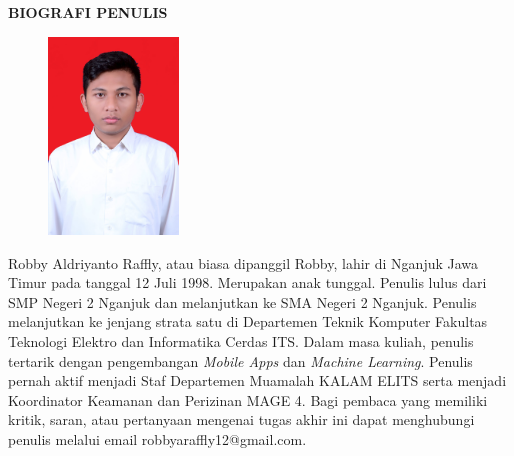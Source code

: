 \begin{center}
\Large\textbf{BIOGRAFI PENULIS}
\end{center}
\vspace{1ex}

\begin{figure}
	\centering
	\vspace{-3ex}	
	\includegraphics[width=0.31\textwidth]{img/robby.jpg}
	\vspace{-4ex}
\end{figure}
\noindent Robby Aldriyanto Raffly, atau biasa dipanggil Robby, lahir di Nganjuk Jawa Timur pada tanggal 12 Juli 1998. Merupakan anak tunggal. Penulis lulus dari SMP Negeri 2 Nganjuk dan melanjutkan ke SMA Negeri 2 Nganjuk. Penulis melanjutkan ke jenjang strata satu di Departemen Teknik Komputer Fakultas Teknologi Elektro dan Informatika Cerdas ITS. Dalam masa kuliah, penulis tertarik dengan pengembangan \textit{Mobile Apps} dan \textit{Machine Learning}. Penulis pernah aktif menjadi Staf Departemen Muamalah KALAM ELITS serta menjadi Koordinator Keamanan dan Perizinan MAGE 4. Bagi pembaca yang memiliki kritik, saran, atau pertanyaan mengenai tugas akhir ini dapat menghubungi penulis melalui email robbyaraffly12@gmail.com.
